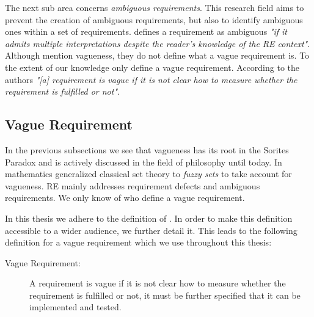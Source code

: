 The next sub area concerns \textit{ambiguous requirements}.
This research field aims to prevent the creation of ambiguous requirements, but also to identify ambiguous ones within a set of requirements.
\Textcite{Kamsties:2000} defines a requirement as ambiguous \textit{"if it admits multiple interpretations despite the reader’s knowledge of the RE context"}.
Although \textcite{Kamsties:2000} mention vagueness, they do not define what a vague requirement is.
To the extent of our knowledge only \textcite{Berry:2003} define a vague requirement.
According to the authors \textit{"[a] requirement is vague if it is not clear how to measure whether the requirement is fulfilled or not"}.

\subsection{Vague Requirement}
\label{chp:fundamentals:sec:vagueness:subsec:vague_requirement}
In the previous subsections we see that vagueness has its root in the Sorites Paradox and is actively discussed in the field of philosophy until today.
In mathematics \textcite{Zadeh:1965} generalized classical set theory to \textit{fuzzy sets} to take account for vagueness.
\Ac{RE} mainly addresses requirement defects and ambiguous requirements.
We only know of \textcite{Berry:2003} who define a vague requirement.

In this thesis we adhere to the definition of \textcite{Berry:2003}.
In order to make this definition accessible to a wider audience, we further detail it.
This leads to the following definition for a vague requirement which we use throughout this thesis:
\begin{description}
    \item[Vague Requirement:] A requirement is vague if it is not clear how to measure whether the requirement is fulfilled or not, it must be further specified that it can be implemented and tested.
\end{description}

